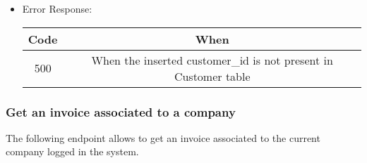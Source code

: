 \begin{itemize}
    \item Error Response:
    \begin{table}[!h]
    \centering 
    \begin{tabular}{|c|c|}
    \hline
    \multicolumn{1}{|c|}{\textbf{Code}} & \multicolumn{1}{c|}{\textbf{When}} \\ \hline
    500 & When the inserted customer\_id is not present in Customer table \\\hline
    \end{tabular} 
    \end{table} 
    
\end{itemize}


\subsubsection*{Get an invoice associated to a company}

The following endpoint allows to get an invoice associated to the current company logged in the system.

